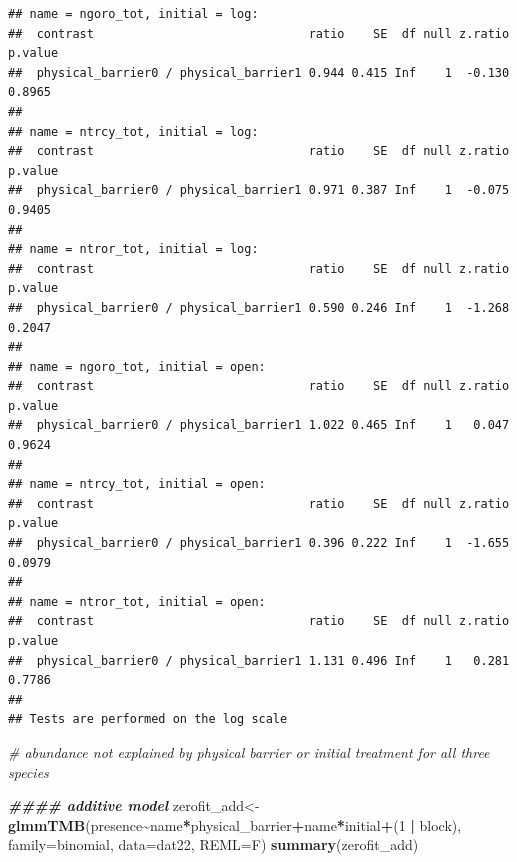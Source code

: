 \documentclass[
]{article}
\newenvironment{Shaded}{\begin{snugshade}}{\end{snugshade}}
\newcommand{\AttributeTok}[1]{\textcolor[rgb]{0.13,0.29,0.53}{#1}}
\newcommand{\CommentTok}[1]{\textcolor[rgb]{0.56,0.35,0.01}{\textit{#1}}}
\newcommand{\DecValTok}[1]{\textcolor[rgb]{0.00,0.00,0.81}{#1}}
\newcommand{\DocumentationTok}[1]{\textcolor[rgb]{0.56,0.35,0.01}{\textbf{\textit{#1}}}}
\newcommand{\FunctionTok}[1]{\textcolor[rgb]{0.13,0.29,0.53}{\textbf{#1}}}
\newcommand{\NormalTok}[1]{#1}
\newcommand{\OtherTok}[1]{\textcolor[rgb]{0.56,0.35,0.01}{#1}}
\newcommand{\SpecialCharTok}[1]{\textcolor[rgb]{0.81,0.36,0.00}{\textbf{#1}}}
\begin{document}
\begin{verbatim}
## name = ngoro_tot, initial = log:
##  contrast                              ratio    SE  df null z.ratio p.value
##  physical_barrier0 / physical_barrier1 0.944 0.415 Inf    1  -0.130  0.8965
## 
## name = ntrcy_tot, initial = log:
##  contrast                              ratio    SE  df null z.ratio p.value
##  physical_barrier0 / physical_barrier1 0.971 0.387 Inf    1  -0.075  0.9405
## 
## name = ntror_tot, initial = log:
##  contrast                              ratio    SE  df null z.ratio p.value
##  physical_barrier0 / physical_barrier1 0.590 0.246 Inf    1  -1.268  0.2047
## 
## name = ngoro_tot, initial = open:
##  contrast                              ratio    SE  df null z.ratio p.value
##  physical_barrier0 / physical_barrier1 1.022 0.465 Inf    1   0.047  0.9624
## 
## name = ntrcy_tot, initial = open:
##  contrast                              ratio    SE  df null z.ratio p.value
##  physical_barrier0 / physical_barrier1 0.396 0.222 Inf    1  -1.655  0.0979
## 
## name = ntror_tot, initial = open:
##  contrast                              ratio    SE  df null z.ratio p.value
##  physical_barrier0 / physical_barrier1 1.131 0.496 Inf    1   0.281  0.7786
## 
## Tests are performed on the log scale
\end{verbatim}

\begin{Shaded}
\begin{Highlighting}[]
\CommentTok{\# abundance not explained by physical barrier or initial treatment for all three species}

\DocumentationTok{\#\#\#\# additive model }
\NormalTok{zerofit\_add}\OtherTok{\textless{}{-}}\FunctionTok{glmmTMB}\NormalTok{(presence}\SpecialCharTok{\textasciitilde{}}\NormalTok{name}\SpecialCharTok{*}\NormalTok{physical\_barrier}\SpecialCharTok{+}\NormalTok{name}\SpecialCharTok{*}\NormalTok{initial}\SpecialCharTok{+}\NormalTok{(}\DecValTok{1} \SpecialCharTok{|}\NormalTok{ block), }\AttributeTok{family=}\NormalTok{binomial, }\AttributeTok{data=}\NormalTok{dat22, }\AttributeTok{REML=}\NormalTok{F)}
\FunctionTok{summary}\NormalTok{(zerofit\_add)}
\end{Highlighting}
\end{Shaded}
\end{document}
